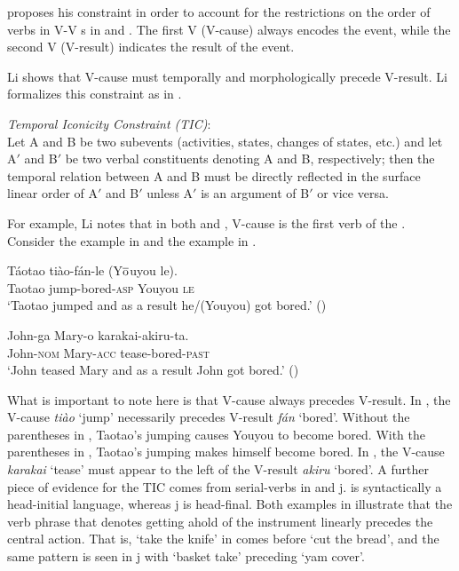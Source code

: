 \documentclass[output=paper]{LSP/langsci}
\begin{document}
\citet[499]{Li1993} proposes his constraint in order to account for the restrictions on the order of verbs in V-V  s in  and . The first V (V-cause) always encodes the event, while the second V (V-result) indicates the result of the event. 

Li shows that V-cause must temporally and morphologically precede V-result. Li formalizes this constraint as in .

\begin{exe}

\ex\label{ex:rosen:32}
 \emph{Temporal Iconicity Constraint (TIC)}:\\
 Let A and B be two subevents (activities, states, changes of states, etc.) and let A$'$ and B$'$ be two verbal constituents denoting A and B, respectively; then the temporal relation between A and B must be directly reflected in the surface linear order of A$'$ and B$'$ unless A$'$ is an argument of B$'$ or vice versa.
 
 \end{exe}

For example, Li notes that in both  and , V-cause is the first verb of the . Consider the  example in  and the  example in .

 \begin{exe}
 \ex \label{ex:rosen:33}
 \gll Táotao tiào-fán-le (Y$\overline{\rm{o}}$uyou le).\\
 Taotao jump-bored-\textsc{asp} Youyou \textsc{le}\\
 \glt `Taotao jumped and as a result he/(Youyou) got bored.' ()
 
 \ex \label{ex:rosen:34}
\gll John-ga Mary-o karakai-akiru-ta.\\
 John-\textsc{nom} Mary-\textsc{acc} tease-bored-\textsc{past}\\
 \glt `John teased Mary and as a result John got bored.'  (\citealt[481 (2b)]{Li1993})
 
 \end{exe}

What is important to note here is that V-cause always precedes V-result. In , the V-cause \textit{ti\`ao} `jump' necessarily precedes V-result \textit{f\'an} `bored'. Without the parentheses in , Taotao's jumping causes Youyou to become bored. With the parentheses in , Taotao's jumping makes himself become bored. In , the V-cause \textit{karakai} `tease' must appear to the left of the V-result \textit{akiru} `bored'. A further piece of evidence for the TIC comes from serial-verbs in  and j.  is syntactically a head-initial language, whereas j is head-final. Both examples in  illustrate that the verb phrase that denotes getting ahold of the instrument linearly precedes the central action. That is, `take the knife' in  comes before `cut the bread', and the same pattern is seen in j with `basket take' preceding `yam cover'.
\end{document}
